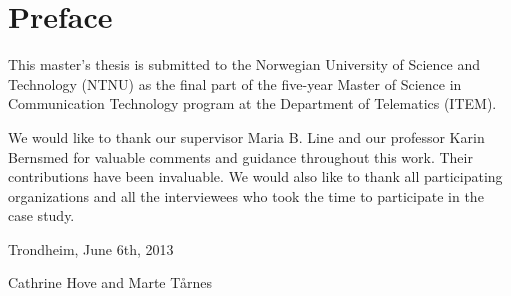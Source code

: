 \chapter*{Preface}
This master's thesis is submitted to the Norwegian University of Science and Technology (NTNU) as the final part of the five-year Master of Science in Communication Technology program at the Department of Telematics (ITEM).

We would like to thank our supervisor Maria B. Line and our professor Karin Bernsmed for valuable comments and guidance throughout this work. Their contributions have been invaluable. We would also like to thank all participating organizations and all the interviewees who took the time to participate in the case study.

Trondheim, June 6th, 2013

Cathrine Hove and Marte T\aa rnes